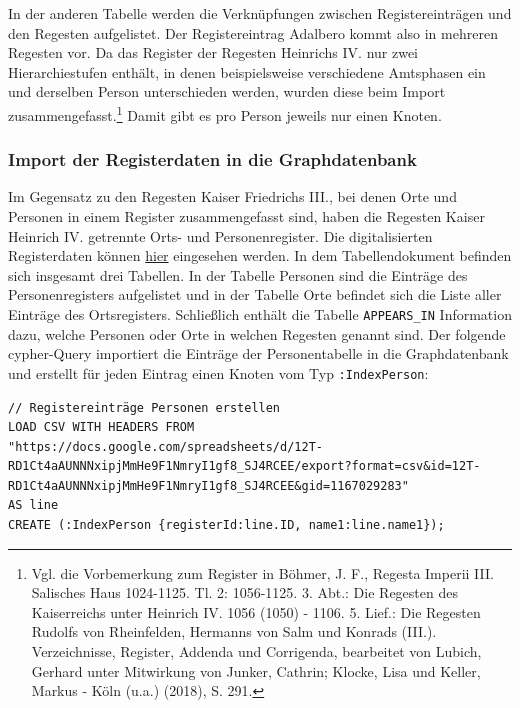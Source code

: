 In der anderen Tabelle werden die Verknüpfungen zwischen
Registereinträgen und den Regesten aufgelistet. Der Registereintrag
Adalbero kommt also in mehreren Regesten vor. Da das Register der
Regesten Heinrichs IV. nur zwei Hierarchiestufen enthält, in denen
beispielsweise verschiedene Amtsphasen ein und derselben Person
unterschieden werden, wurden diese beim Import
zusammengefasst.\footnote{Vgl. die Vorbemerkung zum Register in Böhmer,
  J. F., Regesta Imperii III. Salisches Haus 1024-1125. Tl. 2:
  1056-1125. 3. Abt.: Die Regesten des Kaiserreichs unter Heinrich IV.
  1056 (1050) - 1106. 5. Lief.: Die Regesten Rudolfs von Rheinfelden,
  Hermanns von Salm und Konrads (III.). Verzeichnisse, Register, Addenda
  und Corrigenda, bearbeitet von Lubich, Gerhard unter Mitwirkung von
  Junker, Cathrin; Klocke, Lisa und Keller, Markus - Köln (u.a.) (2018),
  S. 291.} Damit gibt es pro Person jeweils nur einen Knoten.

\hypertarget{import-der-registerdaten-in-die-graphdatenbank-1}{%
\subsubsection{Import der Registerdaten in die
Graphdatenbank}\label{import-der-registerdaten-in-die-graphdatenbank-1}}

Im Gegensatz zu den Regesten Kaiser Friedrichs III., bei denen Orte und
Personen in einem Register zusammengefasst sind, haben die Regesten
Kaiser Heinrich IV. getrennte Orts- und Personenregister. Die
digitalisierten Registerdaten können
\href{https://docs.google.com/spreadsheets/d/12T-RD1Ct4aAUNNNxipjMmHe9F1NmryI1gf8_SJ4RCEE/edit?usp=sharing}{hier}
eingesehen werden. In dem Tabellendokument befinden sich insgesamt drei
Tabellen. In der Tabelle Personen sind die Einträge des
Personenregisters aufgelistet und in der Tabelle Orte befindet sich die
Liste aller Einträge des Ortsregisters. Schließlich enthält die Tabelle
\texttt{APPEARS\_IN} Information dazu, welche Personen oder Orte in
welchen Regesten genannt sind. Der folgende cypher-Query importiert die
Einträge der Personentabelle in die Graphdatenbank und erstellt für
jeden Eintrag einen Knoten vom Typ \texttt{:IndexPerson}:

\begin{verbatim}
// Registereinträge Personen erstellen
LOAD CSV WITH HEADERS FROM "https://docs.google.com/spreadsheets/d/12T-RD1Ct4aAUNNNxipjMmHe9F1NmryI1gf8_SJ4RCEE/export?format=csv&id=12T-RD1Ct4aAUNNNxipjMmHe9F1NmryI1gf8_SJ4RCEE&gid=1167029283"
AS line
CREATE (:IndexPerson {registerId:line.ID, name1:line.name1});
\end{verbatim}

